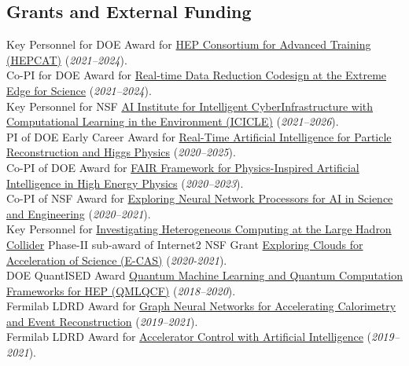 \documentclass[11pt]{res}
\newcommand{\MarginText}[1]{\section{#1}\vspace{10pt}}
\begin{document}
\begin{resume}
\MarginText{Grants and External Funding}
Key Personnel for DOE Award for \href{https://science.osti.gov/-/media/hep/pdf/Awards/HEP_instrumentation_awards_list.pdf}{HEP Consortium for Advanced Training (HEPCAT)} (\textit{2021--2024}).\\
Co-PI for DOE Award for \href{https://science.osti.gov/-/media/ascr/pdf/funding/2021/Data_Reduction_Awards.pdf}{Real‐time Data Reduction Codesign at the Extreme Edge for Science} (\textit{2021--2024}).\\
Key Personnel for NSF \href{https://www.nsf.gov/awardsearch/showAward?AWD_ID=2112606&HistoricalAwards=false}{AI Institute for Intelligent CyberInfrastructure with Computational Learning in the Environment (ICICLE)} (\textit{2021--2026}).\\
PI of DOE Early Career Award for \href{https://science.osti.gov/-/media/early-career/pdf/FY20_DOE_SC_Early_Career_Research_Program_Abstracts.pdf}{Real-Time Artificial Intelligence for Particle Reconstruction and Higgs Physics} (\textit{2020--2025}).\\
Co-PI of DOE Award for \href{https://science.osti.gov/-/media/ascr/pdf/programdocuments/docs/2020/List_of_Awards_FAIR_Data.pdf}{FAIR Framework for Physics-Inspired Artificial Intelligence in
High Energy Physics} (\textit{2020--2023}).\\
Co-PI of NSF Award for \href{https://nsf.gov/awardsearch/showAward?AWD_ID=2005369}{Exploring Neural Network Processors for AI in Science and Engineering} (\textit{2020--2021}).\\
Key Personnel for \href{https://www.internet2.edu/news/detail/17957/}{Investigating Heterogeneous Computing at the Large Hadron Collider} Phase-II sub-award of Internet2 NSF Grant \href{https://www.nsf.gov/awardsearch/showAward?AWD_ID=1904444}{Exploring Clouds for Acceleration of Science (E-CAS)} (\textit{2020-2021}).\\
DOE QuantISED Award \href{https://pamspublic.science.energy.gov/WebPAMSExternal/Interface/Common/ViewPublicAbstract.aspx?rv=1f7d4729-6f93-40bd-a55f-c108545b1ea9&rtc=24&PRoleId=10}{Quantum Machine Learning and Quantum Computation Frameworks for HEP (QMLQCF)} (\textit{2018--2020}).\\
Fermilab LDRD Award for \href{https://ldrd.fnal.gov/subdir/FNAL-LDRD-2019-017-D1.pdf}{Graph Neural Networks for Accelerating Calorimetry and Event Reconstruction} (\textit{2019--2021}).\\
Fermilab LDRD Award for \href{https://ldrd.fnal.gov/subdir/FNAL-LDRD-2019-027-D1.pdf}{Accelerator Control with Artificial Intelligence} (\textit{2019--2021}).


\end{resume}
\end{document}
